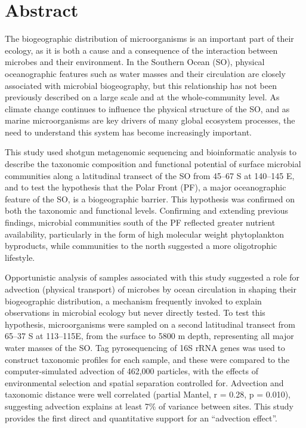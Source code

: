 \chapter*{Abstract}
The biogeographic distribution of microorganisms is an important part of their ecology, as it is both a cause and a consequence of the interaction between microbes and their environment.
In the Southern Ocean (SO), physical oceanographic features such as water masses and their circulation are closely associated with microbial biogeography, but this relationship has not been previously described on a large scale and at the whole-community level.
As climate change continues to influence the physical structure of the SO, and as marine microorganisms are key drivers of many global ecosystem processes, the need to understand this system has become increasingly important.

This study used shotgun metagenomic sequencing and bioinformatic analysis to describe the taxonomic composition and functional potential of surface microbial communities along a latitudinal transect of the SO from 45\textdegree{}--67\textdegree{} S at 140\textdegree{}--145\textdegree{} E, and to test the hypothesis that the Polar Front (PF), a major oceanographic feature of the SO, is a biogeographic barrier.
This hypothesis was confirmed on both the taxonomic and functional levels.
Confirming and extending previous findings, microbial communities south of the PF reflected greater nutrient availability, particularly in the form of high molecular weight phytoplankton byproducts, while communities to the north suggested a more oligotrophic lifestyle.

Opportunistic analysis of samples associated with this study suggested a role for advection (physical transport) of microbes by ocean circulation in shaping their biogeographic distribution, a mechanism frequently invoked to explain observations in microbial ecology but never directly tested.
To test this hypothesis, microorganisms were sampled on a second latitudinal transect from 65\textdegree{}--37\textdegree{} S at 113\textdegree{}--115\textdegree{}E, from the surface to 5800 m depth, representing all major water masses of the SO.
Tag pyrosequencing of 16S rRNA genes was used to construct taxonomic profiles for each sample, and these were compared to the computer-simulated advection of 462,000 particles, with the effects of environmental selection and spatial separation controlled for.
Advection and taxonomic distance were well correlated (partial Mantel, r = 0.28, p = 0.010), suggesting advection explains at least 7\% of variance between sites.
This study provides the first direct and quantitative support for an ``advection effect''.
